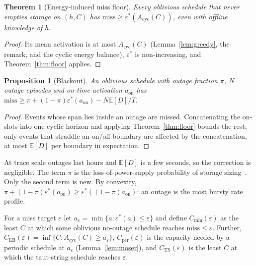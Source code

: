 \documentclass[final,5p,times,twocolumn]{elsarticle}
\newtheorem{theorem}{Theorem}
\newtheorem{proposition}{Proposition}
\theoremstyle{definition}
\theoremstyle{remark}
\newcommand{\eps}{\varepsilon}
\newcommand{\E}{\mathbb{E}}
\begin{document}
\begin{theorem}[Energy-induced miss floor]\label{thm:energy}
Every oblivious schedule that never empties storage on $(h,C)$ has $\mathrm{miss}\ge\eps^*(A_{\mathrm{cyc}}(C))$, even with offline knowledge of $h$.
\end{theorem}
\begin{proof}
Its mean activation is at most $A_{\mathrm{cyc}}(C)$ (Lemma~\ref{lem:greedy}, the remark, and the cyclic energy balance), $\eps^*$ is non-increasing, and Theorem~\ref{thm:floor} applies.
\end{proof}

\begin{proposition}[Blackout]\label{prop:blackout}
An oblivious schedule with outage fraction $\pi$, $N$ outage episodes and on-time activation $a_{\mathrm{on}}$ has $\mathrm{miss}\ge\pi+(1-\pi)\eps^*(a_{\mathrm{on}})-N\E[D]/T$.
\end{proposition}
\begin{proof}
Events whose span lies inside an outage are missed. Concatenating the on-slots into one cyclic horizon and applying Theorem~\ref{thm:floor} bounds the rest; only events that straddle an on/off boundary are affected by the concatenation, at most $\E[D]$ per boundary in expectation.
\end{proof}
\noindent At trace scale outages last hours and $\E[D]$ is a few seconds, so the correction is negligible. The term $\pi$ is the loss-of-power-supply probability of storage sizing~\cite{borowy1996lpsp}. Only the second term is new. By convexity, $\pi+(1-\pi)\eps^*(a_{\mathrm{on}})\ge\eps^*((1-\pi)a_{\mathrm{on}})$: an outage is the most bursty rate profile.

For a miss target $\eps$ let $a_\eps=\min\{a:\eps^*(a)\le\eps\}$ and define $C_{\min}(\eps)$ as the least $C$ at which some oblivious no-outage schedule reaches $\mathrm{miss}\le\eps$. Further, $C_{\mathrm{LB}}(\eps)=\inf\{C:A_{\mathrm{cyc}}(C)\ge a_\eps\}$, $C_{\mathrm{per}}(\eps)$ is the capacity needed by a periodic schedule at $a_\eps$ (Lemma~\ref{lem:moser}), and $C_{\mathrm{TS}}(\eps)$ is the least $C$ at which the taut-string schedule reaches $\eps$.
\end{document}
